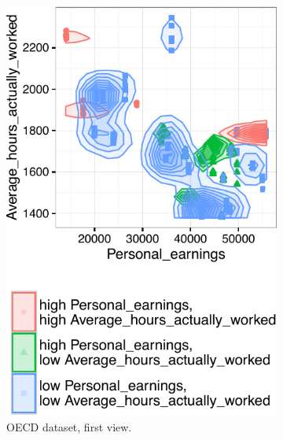 \begin{figure}[t!]
    \centering
    \begin{subfigure}[b]{0.48\columnwidth}
        \includegraphics[width=\textwidth]{Experiments/CaseValidationResized1}
        \caption{OECD dataset, first view.}
        \label{fig:validation1}
    \end{subfigure}
    ~
    \begin{subfigure}[b]{0.48\columnwidth}

\end{subfigure}
\end{figure}
